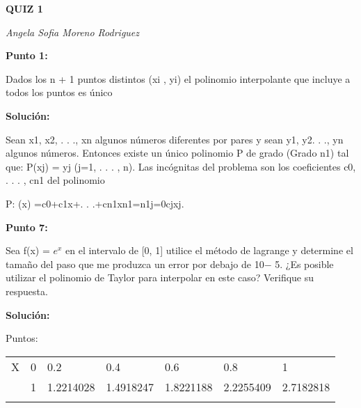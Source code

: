 \documentclass[12pt]{article}
\renewcommand{\_}{\kern-1.5pt\textunderscore\kern-1.5pt}
\begin{document}
\begin{Center}
{\fontsize{14pt}{16.8pt}\selectfont \textbf{QUIZ 1}\par}
\end{Center}\par

\textit{Angela Sofia Moreno Rodriguez}\par

\textbf{Punto 1:}\par

Dados los n + 1 puntos distintos (xi , yi) el polinomio interpolante que incluye a todos los puntos es único\par

\textbf{Solución:}\par

Sean x1, x2, . . ., xn algunos números diferentes por pares y sean y1, y2. . ., yn algunos números. Entonces existe un único polinomio P de grado (Grado n1) tal que: P(xj) = yj (j=1, . . . , n). Las incógnitas del problema son los coeficientes c0, . . . , cn1 del polinomio \par

P: (x) =c0+c1x+. . .+cn1xn1=n1j=0cjxj.\par


\vspace{\baselineskip}
\textbf{Punto 7: }\par

Sea f(x) =  \( e^{x} \)  en el intervalo de [0, 1] utilice el método de lagrange y determine el tamaño del paso que me produzca un error por debajo de 10$-$ 5. ¿Es posible utilizar el polinomio de Taylor para interpolar en este caso? Verifique su respuesta.\par

\textbf{Solución: }\par

Puntos:\par





\begin{table}[H]
 			\centering
\begin{tabular}{p{0.5in}p{0.5in}p{0.61in}p{0.61in}p{0.61in}p{0.61in}p{0.61in}}
\hline
\multicolumn{1}{|p{0.5in}}{X} & 
\multicolumn{1}{|p{0.5in}}{0} & 
\multicolumn{1}{|p{0.61in}}{0.2} & 
\multicolumn{1}{|p{0.61in}}{0.4} & 
\multicolumn{1}{|p{0.61in}}{0.6} & 
\multicolumn{1}{|p{0.61in}}{0.8} & 
\multicolumn{1}{|p{0.61in}|}{1} \\
\hhline{-------}
\multicolumn{1}{|p{0.5in}}{y} & 
\multicolumn{1}{|p{0.5in}}{1} & 
\multicolumn{1}{|p{0.61in}}{1.2214028} & 
\multicolumn{1}{|p{0.61in}}{1.4918247} & 
\multicolumn{1}{|p{0.61in}}{1.8221188} & 
\multicolumn{1}{|p{0.61in}}{2.2255409} & 
\multicolumn{1}{|p{0.61in}|}{2.7182818} \\
\hhline{-------}

\end{tabular}
 \end{table}
\end{document}
